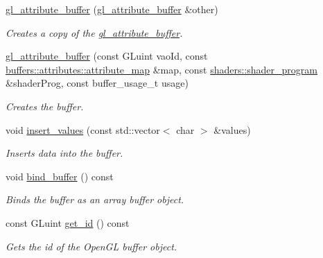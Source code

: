 \begin{DoxyCompactItemize}
\item 
\hyperlink{classoccluded_1_1opengl_1_1retained_1_1gl__attribute__buffer_ae5e26c840ef863b9c5ff3ce438cb83a0}{gl\+\_\+attribute\+\_\+buffer} (\hyperlink{classoccluded_1_1opengl_1_1retained_1_1gl__attribute__buffer}{gl\+\_\+attribute\+\_\+buffer} \&other)
\begin{DoxyCompactList}\small\item\em Creates a copy of the \hyperlink{classoccluded_1_1opengl_1_1retained_1_1gl__attribute__buffer}{gl\+\_\+attribute\+\_\+buffer}. \end{DoxyCompactList}\item 
\hyperlink{classoccluded_1_1opengl_1_1retained_1_1gl__attribute__buffer_a210deb350ee2d7177e95d1b8e0a51c6c}{gl\+\_\+attribute\+\_\+buffer} (const G\+Luint vao\+Id, const \hyperlink{classoccluded_1_1buffers_1_1attributes_1_1attribute__map}{buffers\+::attributes\+::attribute\+\_\+map} \&map, const \hyperlink{classoccluded_1_1opengl_1_1retained_1_1shaders_1_1shader__program}{shaders\+::shader\+\_\+program} \&shader\+Prog, const buffer\+\_\+usage\+\_\+t usage)
\begin{DoxyCompactList}\small\item\em Creates the buffer. \end{DoxyCompactList}\item 
void \hyperlink{classoccluded_1_1opengl_1_1retained_1_1gl__attribute__buffer_afd58deefb5659c0cd9a316263515b68f}{insert\+\_\+values} (const std\+::vector$<$ char $>$ \&values)
\begin{DoxyCompactList}\small\item\em Inserts data into the buffer. \end{DoxyCompactList}\item 
void \hyperlink{classoccluded_1_1opengl_1_1retained_1_1gl__attribute__buffer_a0bc941bf7603a80ea249cd1d64cc2b67}{bind\+\_\+buffer} () const 
\begin{DoxyCompactList}\small\item\em Binds the buffer as an array buffer object. \end{DoxyCompactList}\item 
const G\+Luint \hyperlink{classoccluded_1_1opengl_1_1retained_1_1gl__attribute__buffer_ab23624ebadcabdcb0d028e2fe0039ffd}{get\+\_\+id} () const 
\begin{DoxyCompactList}\small\item\em Gets the id of the Open\+G\+L buffer object. \end{DoxyCompactList}\item 

\end{DoxyCompactItemize}
